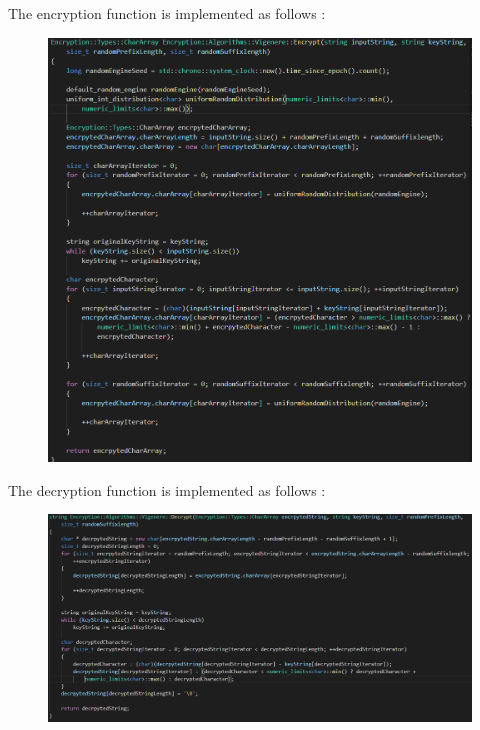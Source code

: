 \documentclass[runningheads]{llncs}
\begin{document}
The encryption function is implemented as follows :\\
\begin{figure}[H]
\centering
\includegraphics[width=150mm]{Vigenere_Encryption.png}
\end{figure}

The decryption function is implemented as follows :\\
\begin{figure}[H]
\centering
\includegraphics[width=150mm]{Vigenere_Decryption.png}
\end{figure}
\end{document}
